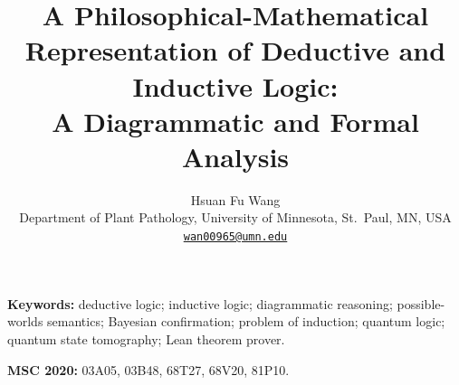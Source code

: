 \documentclass[11pt]{article}
\title{A Philosophical-Mathematical Representation of Deductive and Inductive Logic:\\ A Diagrammatic and Formal Analysis}
\author{Hsuan Fu Wang\\[2pt]
  {\small Department of Plant Pathology, University of Minnesota, St.\ Paul, MN, USA}\\
  {\small\href{mailto:wan00965@umn.edu}{\texttt{wan00965@umn.edu}}}}
\date{}
\begin{document}
\maketitle

\medskip
\noindent\textbf{Keywords:} deductive logic; inductive logic; diagrammatic reasoning;
possible-worlds semantics; Bayesian confirmation; problem of induction; quantum logic;
quantum state tomography; Lean theorem prover.

\smallskip
\noindent\textbf{MSC 2020:} 03A05, 03B48, 68T27, 68V20, 81P10.








\appendix



\end{document}
